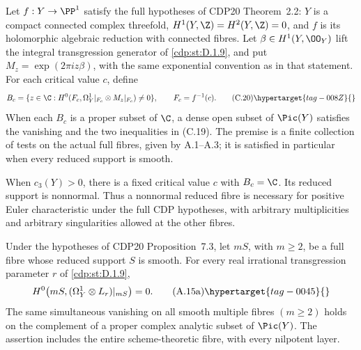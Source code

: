 
\begin{proposition}\hypertarget{tag-01FN}{}\label{cdp:st:C4d}


Let $f:Y\to\PP^1$ satisfy the full hypotheses of CDP20 Theorem~2.2: $Y$ is a compact connected complex threefold, $H^1(Y,\Z)=H^2(Y,\Z)=0$, and $f$ is its holomorphic algebraic reduction with connected fibres. Let $\beta\in H^1(Y,\OO_Y)$ lift the integral transgression generator of \ref{cdp:st:D.1.9}, and put $M_z=\exp(2\pi i z\beta)$, with the same exponential convention as in that statement. For each critical value $c$, define
\[
 B_c=\{z\in\C:
 H^0(F_c,\Omega_Y^1|_{F_c}\otimes M_z|_{F_c})\ne0\},
 \qquad F_c=f^{-1}(c).
 \tag{C.20}\hypertarget{tag-008Z}{}\label{cdp:eq:C.20}
\]
When each $B_c$ is a proper subset of $\C$, a dense open subset of $\Pic(Y)$ satisfies the vanishing and the two inequalities in (C.19). The premise is a finite collection of tests on the actual full fibres, given by A.1--A.3; it is satisfied in particular when every reduced support is smooth.

When $c_3(Y)>0$, there is a fixed critical value $c$ with $B_c=\C$. Its reduced support is nonnormal. Thus a nonnormal reduced fibre is necessary for positive Euler characteristic under the full CDP hypotheses, with arbitrary multiplicities and arbitrary singularities allowed at the other fibres.
\end{proposition}

\begin{proposition}\hypertarget{tag-01AO}{}\label{cdp:st:A.3.4}


Under the hypotheses of CDP20 Proposition~7.3, let $mS$, with $m\ge2$, be a full fibre whose reduced support $S$ is smooth. For every real irrational transgression parameter $r$ of \ref{cdp:st:D.1.9},
\[
 H^0\bigl(mS,(\Omega_Y^1\otimes L_r)|_{mS}\bigr)=0.
 \tag{A.15a}\hypertarget{tag-0045}{}\label{cdp:eq:A.15a}
\]
The same simultaneous vanishing on all smooth multiple fibres $(m\ge2)$ holds on the complement of a proper complex analytic subset of $\Pic(Y)$. The assertion includes the entire scheme-theoretic fibre, with every nilpotent layer.
\end{proposition}

